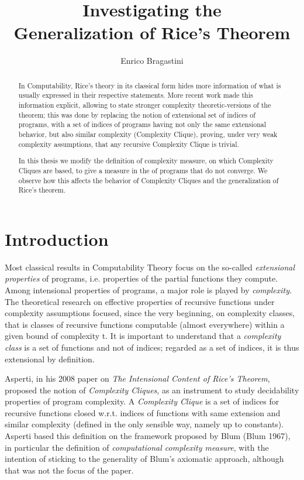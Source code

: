 \documentclass[10pt, a4paper, oneside, titlepage, draft]{article}
\title{Investigating the\\Generalization of Rice's Theorem}
\author{Enrico Bragastini}
\date{}
\begin{document}
\maketitle

\begin{abstract}
In Computability, Rice's theory in its classical form hides more information 
of what is usually expressed in their respective statements. 
More recent work made this information explicit, allowing to state stronger 
complexity theoretic-versions of the theorem; this was done by replacing the notion 
of extensional set of indices of programs, with a set of indices of programs having 
not only the same extensional behavior, but also similar complexity (Complexity Clique), 
proving, under very weak complexity assumptions, that any recursive Complexity Clique is trivial. 

In this thesis we modify the definition of complexity measure, on which Complexity Cliques are based, to give a measure in the of programs that do not converge. We observe how this affects the behavior of Complexity Cliques and the generalization of Rice's theorem.
\end{abstract}

\section{Introduction}
Most classical results in Computability Theory focus on the so-called \textit{extensional properties} of programs, i.e. properties of the partial functions they compute.
Among intensional properties of programs, a major role is played by \textit{complexity}.
The theoretical research on effective properties of recursive functions under complexity assumptions focused, since the very beginning, on complexity classes, that is classes of recursive functions computable (almost everywhere) within a given bound of complexity t.
It is important to understand that a \textit{complexity class} is a set of functions and not of indices; regarded as a set of indices, it is thus extensional by definition.

Asperti, in his 2008 paper on \textit{The Intensional Content of Rice's Theorem}, proposed the notion of \textit{Complexity Cliques}, as an instrument to study decidability properties of program complexity.
A \textit{Complexity Clique} is a set of indices for recursive functions closed w.r.t. indices of functions with same extension and similar complexity (defined in the only sensible way, namely up to constants).
Asperti based this definition on the framework proposed by Blum (Blum 1967), in particular the definition of \textit{computational complexity measure}, with the intention of sticking to the generality of Blum's axiomatic approach, although that was not the focus of the paper.
\end{document}
